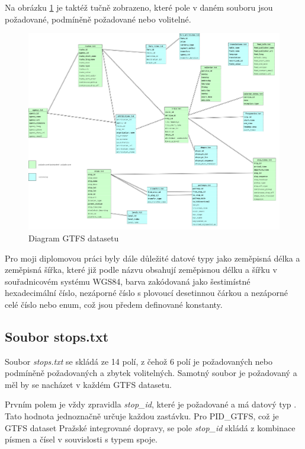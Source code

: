 Na obrázku \ref{fig:GTFS-diagram} je taktéž tučně zobrazeno, které pole v daném  souboru
jsou požadované, podmíněně požadované nebo volitelné. 

\begin{figure}[H] \centering
    \includegraphics[width=400pt]{./pictures/GTFS-diagram.PNG}
    \caption[Diagram GTFS datasetu]{Diagram GTFS datasetu}
	\label{fig:GTFS-diagram}              
\end{figure}

Pro moji diplomovou práci byly dále důležité datové typy jako zeměpisná délka a zeměpisná šířka,
které již podle názvu obsahují zeměpisnou délku a šířku v souřadnicovém systému WGS84, barva zakódovaná 
jako šestimístné hexadecimální číslo, nezáporné číslo s plovoucí desetinnou čárkou a nezáporné celé číslo
nebo enum, což jsou předem definované konstanty.

\subsection{Soubor stops.txt}
\label{stops.txt}
Soubor \textit{stops.txt} se skládá ze 14 polí, z čehož 6 polí je požadovaných nebo podmíněně požadovaných 
a zbytek volitelných. Samotný soubor je požadovaný a měl by se nacházet v každém GTFS datasetu.

Prvním polem je vždy zpravidla \textit{stop\_id}, které je požadované a má datový typ .
Tato hodnota jednoznačně určuje každou zastávku. Pro PID\_GTFS, což je GTFS dataset Pražské integrované dopravy,
se pole \textit{stop\_id} skládá z kombinace písmen a čísel v souvislosti s typem spoje.

